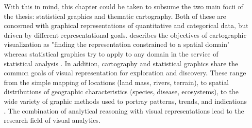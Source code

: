 With this in mind, this chapter could be taken to subsume the two main focii of the thesis: statistical graphics and thematic cartography. Both of these are concerned with graphical representations of quantitative and categorical data, but driven by different representational goals. \citeauthor{Friendly.2001} describes the objectives of cartographic visualization as "finding the representation constrained to a spatial domain" whereas statistical graphics try to apply to any domain in the service of statistical analysis . In addition, cartography and statistical graphics share the common goals of visual representation for exploration and discovery. These range from the simple mapping of locations (land mass, rivers, terrain), to spatial distributions of geographic characteristics (species, disease, ecosystems), to the wide variety of graphic methods used to portray patterns, trends, and indications . The combination of analytical reasoning with visual representations lead to the research field of visual analytics.


